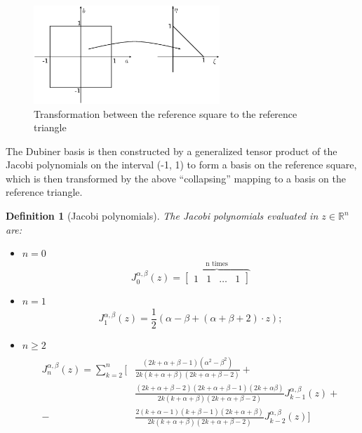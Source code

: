 \documentclass[a4paper,12pt]{article}
\newtheorem{definition}{Definition}
\begin{document}
    \begin{figure}[h]
    \begin{center}
    \includegraphics[width = 7cm]{./transformation.png}
    	\caption{Transformation between the reference square to the reference triangle}
    	\label{transformation}
    \end{center}
    \end{figure}
    
    The Dubiner basis is then constructed by a generalized tensor product of the Jacobi polynomials on the interval (-1, 1) to form a basis on the reference square, which is then transformed by the above “collapsing” mapping to a basis on the reference triangle.
    \begin{definition}[Jacobi polynomials]
    The Jacobi polynomials evaluated in $z\in \mathbb{R}^n$ are:
    \begin{itemize}[label=\textendash]
    \item $n=0$
    \begin{equation}
    J_0^{\alpha,\beta}(z)=\overbrace{\begin{bmatrix} 1 & 1 &\dots &1 \end{bmatrix}}^{\text{n times}}
    \end{equation}
    \item $n=1$
    \begin{equation}
    J_1^{\alpha,\beta}(z)=\frac{1}{2}(\alpha-\beta+(\alpha+\beta+2)\cdot z);
    \end{equation}
    \item $n\ge2$
    \newline
    \begin{equation}
    \begin{gathered}
    \begin{aligned}
    J_n^{\alpha,\beta}(z)=\sum_{k=2}^{n} \Big[&\frac{(2k+\alpha+\beta-1)(\alpha^{2}-\beta^{2})}{2k(k+\alpha+\beta)(2k+\alpha+\beta-2)}+ \\ &\frac{(2k+\alpha+\beta-2)(2k+\alpha+\beta-1)(2k+\alpha \beta)}{2k(k+\alpha+\beta)(2k+\alpha+\beta-2)} J_{k-1}^{\alpha,\beta}(z) +
    \\-&\frac{2(k+\alpha-1)(k+\beta-1)(2k+\alpha+\beta)}{2k(k+\alpha+\beta)(2k+\alpha+\beta-2)} J_{k-2}^{\alpha,\beta}(z) \Big]
    \end{aligned}
    \end{gathered}
    \end{equation}
    \end{itemize}
    \end{definition}
    
\end{document}
